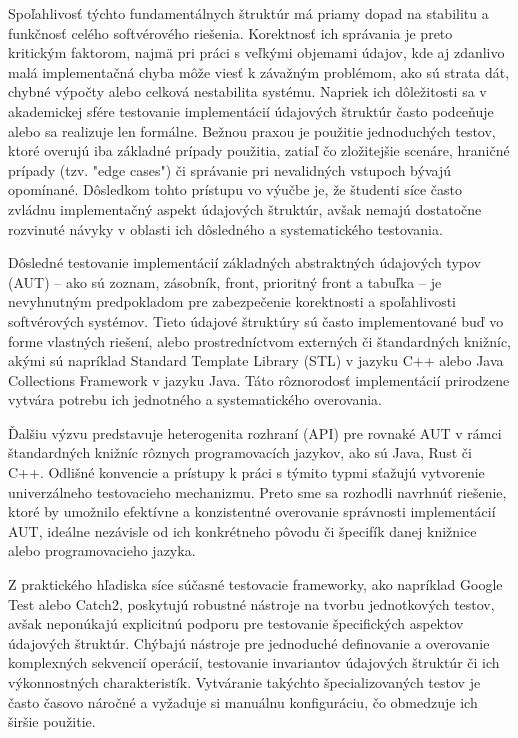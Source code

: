 \documentclass[11pt]{article}
\begin{document}
Spoľahlivosť týchto fundamentálnych štruktúr má priamy dopad na stabilitu a funkčnosť celého softvérového riešenia. Korektnosť ich správania je preto kritickým faktorom, najmä pri práci s veľkými objemami údajov, kde aj zdanlivo malá implementačná chyba môže viesť k závažným problémom, ako sú strata dát, chybné výpočty alebo celková nestabilita systému. Napriek ich dôležitosti sa v akademickej sfére testovanie implementácií údajových štruktúr často podceňuje alebo sa realizuje len formálne. Bežnou praxou je použitie jednoduchých testov, ktoré overujú iba základné prípady použitia, zatiaľ čo zložitejšie scenáre, hraničné prípady (tzv. "edge cases") či správanie pri nevalidných vstupoch bývajú opomínané. Dôsledkom tohto prístupu vo výučbe je, že študenti síce často zvládnu implementačný aspekt údajových štruktúr, avšak nemajú dostatočne rozvinuté návyky v oblasti ich dôsledného a systematického testovania.

Dôsledné testovanie implementácií základných abstraktných údajových typov (AUT) -- ako sú zoznam, zásobník, front, prioritný front a tabuľka -- je nevyhnutným predpokladom pre zabezpečenie korektnosti a spoľahlivosti softvérových systémov. Tieto údajové štruktúry sú často implementované buď vo forme vlastných riešení, alebo prostredníctvom externých či štandardných knižníc, akými sú napríklad Standard Template Library (STL) v jazyku C++ alebo Java Collections Framework v jazyku Java. Táto rôznorodosť implementácií prirodzene vytvára potrebu ich jednotného a systematického overovania.

Ďalšiu výzvu predstavuje heterogenita rozhraní (API) pre rovnaké AUT v rámci štandardných knižníc rôznych programovacích jazykov, ako sú Java, Rust či C++. Odlišné konvencie a prístupy k práci s týmito typmi sťažujú vytvorenie univerzálneho testovacieho mechanizmu. Preto sme sa rozhodli navrhnúť riešenie, ktoré by umožnilo efektívne a konzistentné overovanie správnosti implementácií AUT, ideálne nezávisle od ich konkrétneho pôvodu či špecifík danej knižnice alebo programovacieho jazyka.

Z praktického hľadiska síce súčasné testovacie frameworky, ako napríklad Google Test alebo Catch2, poskytujú robustné nástroje na tvorbu jednotkových testov, avšak neponúkajú explicitnú podporu pre testovanie špecifických aspektov údajových štruktúr. Chýbajú nástroje pre jednoduché definovanie a overovanie komplexných sekvencií operácií, testovanie invariantov údajových štruktúr či ich výkonnostných charakteristík. Vytváranie takýchto špecializovaných testov je často časovo náročné a vyžaduje si manuálnu konfiguráciu, čo obmedzuje ich širšie použitie.
\end{document}
